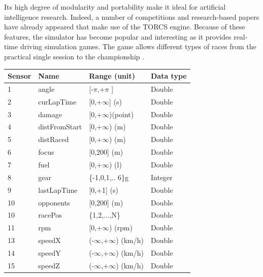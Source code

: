 \documentclass[runningheads,a4paper]{llncs}
\begin{document}
Its high degree of modularity and portability make it ideal for artificial intelligence  research. Indeed, a number of competitions and research-based papers have already appeared that make use of the TORCS engine. Because of these features, the simulator has become popular and interesting as it provides real-time driving simulation games. \cite{24} The game allows different types of races from the practical single session to the championship \cite{torcs4}.
	\begin{table}[ht!]
		{\scriptsize
			{\centering
				\begin{tabular}{|p{2cm}|p{3cm}|p{3 cm}|p{3 cm}|}
					\hline
					{\textbf{Sensor} }&
					{\textbf{Name} }&
					{\textbf{Range} (unit)} &  
					{\textbf{Data type}}\\ 
					\hline
					1 & angle & [-$\pi$,+$\pi$ ] & Double\\ 
					\hline
					2 & curLapTime & [0,+$\infty$] (s)	& Double\\ 
					\hline 
					3 & damage & [0,+$\infty$)(point)& Double\\ 
					\hline 
					4 & distFromStart & [0,+$\infty$) (m)& Double \\ 
					\hline 
					5 & distRaced &[0,+$\infty$) (m)& Double\\
					\hline 
					
					6 & focus & [0,200] (m)& Double\\
					\hline 
					
					7 & fuel & [0,+$\infty$) (l)& Double\\
					
					\hline
					8 & gear & \{-1,0,1,.. 6\}g& Integer \\
					
					\hline
					9 & lastLapTime &[0,+1] (s) & Double \\
					
					\hline
					10 & opponents &[0,200] (m)& Double \\
					
					\hline
					10 & racePos & \{1,2,...,N\} & Double \\
					\hline
					11 & rpm    & [0,+$\infty$) (rpm)   & Double \\
					\hline  
					13 & speedX & (-$\infty$,+$\infty$) (km/h) & Double\\
					\hline  
					14 & speedY &(-$\infty$,+$\infty$) (km/h)  & Double\\
					\hline 
					15 & speedZ & (-$\infty$,+$\infty$) (km/h) & Double \\
					

\end{tabular}}}
\end{table}
\end{document}
